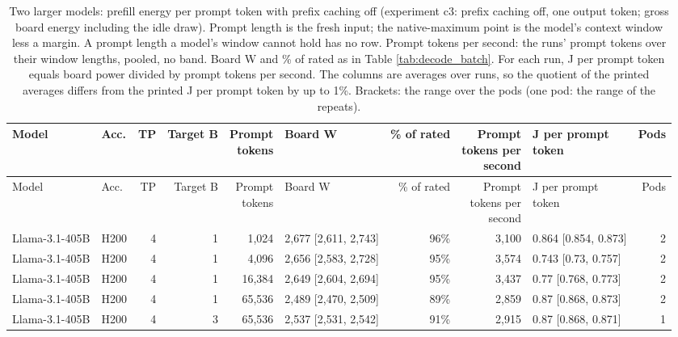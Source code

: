 \begin{landscape}
\begingroup
\scriptsize
\setlength{\tabcolsep}{3pt}
\begin{longtable}{llrrrlrrlr}
\caption{Two larger models: prefill energy per prompt token with prefix caching off (experiment c3: prefix caching off, one output token; gross board energy including the idle draw). Prompt length is the fresh input; the native-maximum point is the model's context window less a margin. A prompt length a model's window cannot hold has no row. Prompt tokens per second: the runs' prompt tokens over their window lengths, pooled, no band. Board W and \% of rated as in Table \ref{tab:decode_batch}. For each run, J per prompt token equals board power divided by prompt tokens per second. The columns are averages over runs, so the quotient of the printed averages differs from the printed J per prompt token by up to 1\%. Brackets: the range over the pods (one pod: the range of the repeats).}\label{tab:size_prefill}\\
\toprule
Model & Acc. & TP & Target B & \makecell[r]{Prompt\\tokens} & Board W & \% of rated & \makecell[r]{Prompt\\tokens per\\second} & \makecell[l]{J per prompt\\token} & Pods \\
\midrule
\endfirsthead
\toprule
Model & Acc. & TP & Target B & \makecell[r]{Prompt\\tokens} & Board W & \% of rated & \makecell[r]{Prompt\\tokens per\\second} & \makecell[l]{J per prompt\\token} & Pods \\
\midrule
\endhead
\bottomrule
\endfoot
Llama-3.1-405B & H200 & 4 & 1 & 1,024 & 2,677 {[}2,611, 2,743{]} & 96\% & 3,100 & 0.864 {[}0.854, 0.873{]} & 2 \\
Llama-3.1-405B & H200 & 4 & 1 & 4,096 & 2,656 {[}2,583, 2,728{]} & 95\% & 3,574 & 0.743 {[}0.73, 0.757{]} & 2 \\
Llama-3.1-405B & H200 & 4 & 1 & 16,384 & 2,649 {[}2,604, 2,694{]} & 95\% & 3,437 & 0.77 {[}0.768, 0.773{]} & 2 \\
Llama-3.1-405B & H200 & 4 & 1 & 65,536 & 2,489 {[}2,470, 2,509{]} & 89\% & 2,859 & 0.87 {[}0.868, 0.873{]} & 2 \\
Llama-3.1-405B & H200 & 4 & 3 & 65,536 & 2,537 {[}2,531, 2,542{]} & 91\% & 2,915 & 0.87 {[}0.868, 0.871{]} & 1 \\

\end{longtable}
\end{landscape}
